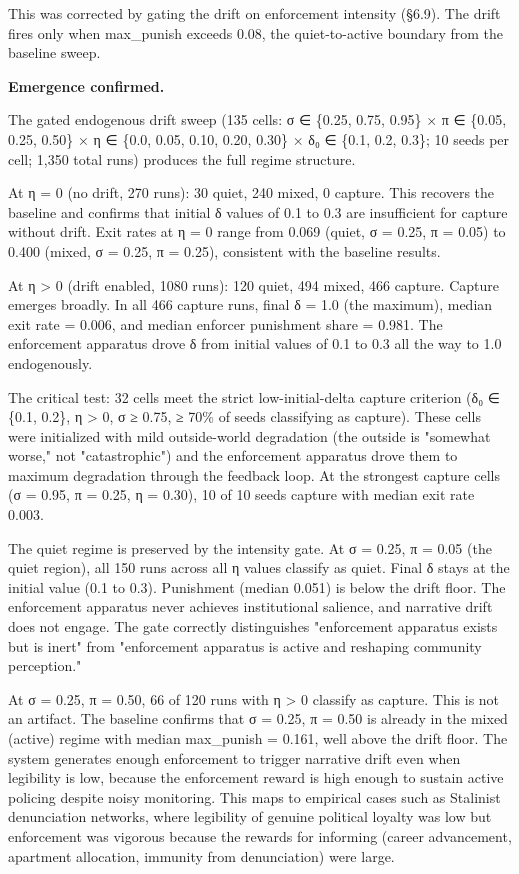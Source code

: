\documentclass[12pt]{article}
\begin{document}
This was corrected by gating the drift on enforcement intensity (§6.9). The drift fires only when max\_punish exceeds 0.08, the quiet-to-active boundary from the baseline sweep.

%

\textbf{Emergence confirmed.}

The gated endogenous drift sweep (135 cells: σ ∈ \{0.25, 0.75, 0.95\} × π ∈ \{0.05, 0.25, 0.50\} × η ∈ \{0.0, 0.05, 0.10, 0.20, 0.30\} × δ₀ ∈ \{0.1, 0.2, 0.3\}; 10 seeds per cell; 1,350 total runs) produces the full regime structure.

At η = 0 (no drift, 270 runs): 30 quiet, 240 mixed, 0 capture. This recovers the baseline and confirms that initial δ values of 0.1 to 0.3 are insufficient for capture without drift. Exit rates at η = 0 range from 0.069 (quiet, σ = 0.25, π = 0.05) to 0.400 (mixed, σ = 0.25, π = 0.25), consistent with the baseline results.

At η > 0 (drift enabled, 1080 runs): 120 quiet, 494 mixed, 466 capture. Capture emerges broadly. In all 466 capture runs, final δ = 1.0 (the maximum), median exit rate = 0.006, and median enforcer punishment share = 0.981. The enforcement apparatus drove δ from initial values of 0.1 to 0.3 all the way to 1.0 endogenously.

The critical test: 32 cells meet the strict low-initial-delta capture criterion (δ₀ ∈ \{0.1, 0.2\}, η > 0, σ ≥ 0.75, ≥ 70\% of seeds classifying as capture). These cells were initialized with mild outside-world degradation (the outside is "somewhat worse," not "catastrophic") and the enforcement apparatus drove them to maximum degradation through the feedback loop. At the strongest capture cells (σ = 0.95, π = 0.25, η = 0.30), 10 of 10 seeds capture with median exit rate 0.003.

The quiet regime is preserved by the intensity gate. At σ = 0.25, π = 0.05 (the quiet region), all 150 runs across all η values classify as quiet. Final δ stays at the initial value (0.1 to 0.3). Punishment (median 0.051) is below the drift floor. The enforcement apparatus never achieves institutional salience, and narrative drift does not engage. The gate correctly distinguishes "enforcement apparatus exists but is inert" from "enforcement apparatus is active and reshaping community perception."

At σ = 0.25, π = 0.50, 66 of 120 runs with η > 0 classify as capture. This is not an artifact. The baseline confirms that σ = 0.25, π = 0.50 is already in the mixed (active) regime with median max\_punish = 0.161, well above the drift floor. The system generates enough enforcement to trigger narrative drift even when legibility is low, because the enforcement reward is high enough to sustain active policing despite noisy monitoring. This maps to empirical cases such as Stalinist denunciation networks, where legibility of genuine political loyalty was low but enforcement was vigorous because the rewards for informing (career advancement, apartment allocation, immunity from denunciation) were large.
\end{document}
